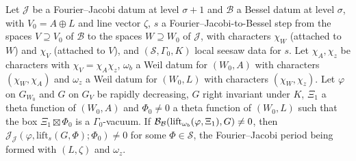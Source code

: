 \begin{proposition}\label{pf:fs:upFB}
Let $\mathcal J$ be a Fourier--Jacobi datum at level $\sigma+1$ and $\mathcal B$ a Bessel datum at level $\sigma$, with $V_0=A\oplus L$ and line
vector $\zeta$, $s$ a Fourier--Jacobi-to-Bessel step from the spaces $V\supseteq V_0$ of $\mathcal B$ to the spaces $W\supseteq W_0$ of $\mathcal J$,
with characters $\chi_W$ (attached to $W$) and $\chi_V$ (attached to $V$), and $(\mathcal S,\Gamma_0,K)$ local seesaw data for $s$. Let
$\chi_A,\chi_z$ be characters with $\chi_V=\chi_A\chi_z$, $\omega_b$ a Weil datum for $(W_0,A)$ with characters $(\chi_W,\chi_A)$ and $\omega_z$
a Weil datum for $(W_0,L)$ with characters $(\chi_W,\chi_z)$. Let $\varphi$ on $G_{W_0}$ and $G$ on $G_V$ be rapidly decreasing, $G$ right
invariant under $K$, $\Xi_1$ a theta function of $(W_0,A)$ and $\Phi_0\ne0$ a theta function of $(W_0,L)$ such that the box
$\Xi_1\boxtimes\Phi_0$ is a $\Gamma_0$-vacuum. If $\mathcal B_{\mathcal B}(\mathrm{lift}_{\omega_b}(\varphi,\Xi_1),G)\ne0$, then
$\mathcal J_{\mathcal J}(\varphi,\mathrm{lift}_s(G,\Phi);\Phi_0)\ne0$ for some $\Phi\in\mathcal S$, the Fourier--Jacobi period being formed with
$(L,\zeta)$ and $\omega_z$.
\end{proposition}

